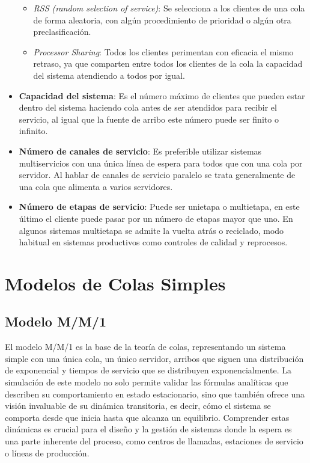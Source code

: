 \documentclass{article}
\begin{document}
\begin{itemize}
\begin{itemize}
            \item   \textit{RSS (random selection of service)}: Se selecciona a los clientes de una cola de forma aleatoria, con algún procedimiento de prioridad o algún otra preclasificación.

            \item \textit{Processor Sharing}: Todos los clientes perimentan con eficacia el mismo retraso, ya que comparten entre todos los clientes de la cola la capacidad del sistema atendiendo a todos por igual.
        \end{itemize}
    
    \item \textbf{Capacidad del sistema}: Es el número máximo de clientes que pueden estar dentro del sistema haciendo cola antes de ser atendidos para recibir el servicio, al igual que la fuente de arribo este número puede ser finito o infinito.
    
    \item \textbf{Número de canales de servicio}: Es preferible utilizar sistemas multiservicios con una única línea de espera para todos que con una cola por servidor. Al hablar de canales de servicio paralelo se trata generalmente de una cola que alimenta a varios servidores.
    
    \item \textbf{Número de etapas de servicio}: Puede ser unietapa o multietapa, en este último el cliente puede pasar por un número de etapas mayor que uno. En algunos sistemas multietapa se admite la vuelta atrás o reciclado, modo habitual en sistemas productivos como controles de calidad y reprocesos.
\end{itemize}

\section{Modelos de Colas Simples}
\subsection{Modelo M/M/1}

El modelo M/M/1 es la base de la teoría de colas, representando un sistema simple con una única cola, un único servidor, arribos que siguen una distribución de exponencial y tiempos de servicio que se distribuyen exponencialmente. La simulación de este modelo no solo permite validar las fórmulas analíticas que describen su comportamiento en estado estacionario, sino que también ofrece una visión invaluable de su dinámica transitoria, es decir, cómo el sistema se comporta desde que inicia hasta que alcanza un equilibrio. Comprender estas dinámicas es crucial para el diseño y la gestión de sistemas donde la espera es una parte inherente del proceso, como centros de llamadas, estaciones de servicio o líneas de producción.
\end{document}
